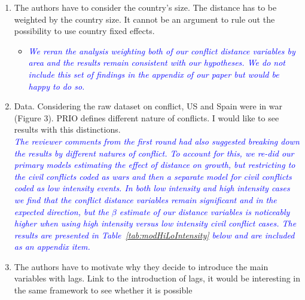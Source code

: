 \begin{enumerate}
\begin{itemize}
\end{itemize}



\FloatBarrier

\newpage
\item The authors have to consider the country’s size. The distance has to be weighted by the country size. It cannot be an argument to rule out the possibility to use country fixed effects. \\

\begin{itemize}
\item \textcolor{blue}{\emph{
	We reran the analysis weighting both of our conflict distance variables by area and the results remain consistent with our hypotheses. We do not include this set of findings in the appendix of our paper but would be happy to do so.
}} \\

\end{itemize}
\FloatBarrier

\newpage
\item Data. Considering the raw dataset on conflict, US and Spain were in war (Figure 3). PRIO defines different nature of conflicts. I would like to see results with this distinctions. \\

\textcolor{blue}{\emph{
	The reviewer comments from the first round had also suggested breaking down the results by different natures of conflict. To account for this, we re-did our primary models estimating the effect of distance on growth, but restricting to the civil conflicts coded as wars and then a separate model for civil conflicts coded as low intensity events. In both low intensity and high intensity cases we find that the conflict distance variables remain significant and in the expected direction, but the $\beta$ estimate of our distance variables is noticeably higher when using high intensity versus low intensity civil conflict cases. The results are presented in Table~\ref{tab:modHiLoIntensity} below and are included as an appendix item.
}} \\

\FloatBarrier

\item The authors have to motivate why they decide to introduce the main variables with lags. Link to the introduction of lags, it would be interesting in the same framework to see whether it is possible \\


\end{enumerate}
